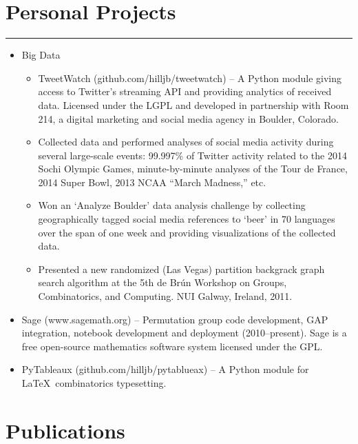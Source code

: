 \documentclass[letterpaper,10pt]{article}
\newcommand{\mblue}{\color{darkblue}}
\begin{document}
\section*{\mblue Personal Projects}

\vspace{-2.15pc}
{\hfill\mblue\rule{5.2in}{0.02cm}}

\begin{itemize}
\item Big Data

\begin{itemize}
\item TweetWatch (github.com/hilljb/tweetwatch) -- A Python module giving access to Twitter's
streaming API and providing analytics of received data. Licensed under the LGPL and developed in
partnership with Room 214, a digital marketing and social media agency in Boulder, Colorado.

\item Collected data and performed analyses of social media activity during several large-scale
events: 99.997\% of Twitter activity related to the 2014 Sochi Olympic Games, minute-by-minute
analyses of the Tour de France, 2014 Super Bowl, 2013 NCAA ``March Madness,'' etc.

\item Won an `Analyze Boulder' data analysis challenge by collecting geographically tagged
social media references to `beer' in 70 languages over the span of one week and providing
visualizations of the collected data.

\item Presented a new randomized (Las Vegas) partition backgrack graph search algorithm at the 5th de
Br\'un Workshop on Groups, Combinatorics, and Computing. NUI Galway, Ireland, 2011. 
\end{itemize}

\item Sage (www.sagemath.org) -- Permutation group code development, GAP integration, notebook
development and deployment (2010--present). Sage is a free open-source mathematics software system
licensed under the GPL.

\item PyTableaux (github.com/hilljb/pytablueax) -- A Python module for \LaTeX\ combinatorics
typesetting. 
\end{itemize}


\section*{\mblue Publications}
\end{document}
